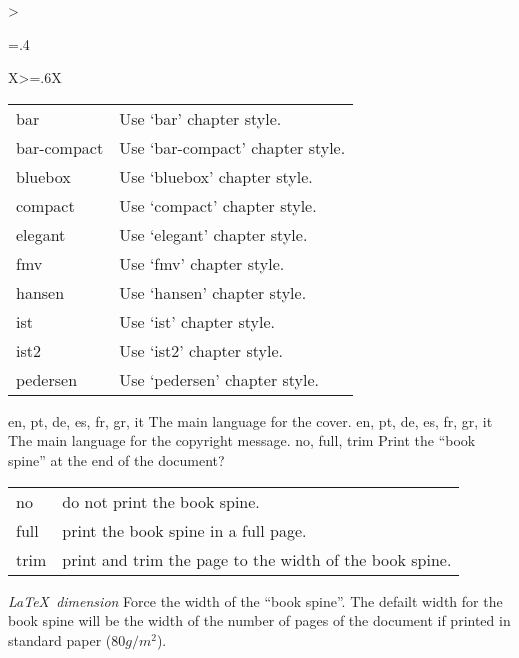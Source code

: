 \begin{xltabular}{\linewidth}{>{\hsize=.4\hsize\raggedright\arraybackslash}X>{\hsize=.6\hsize}X}
{	    \begin{tabular}{@{}l@{ $\rightarrow$ }X@{}}
		bar 		& Use `bar' chapter style. \\
		bar-compact	& Use `bar-compact' chapter style.\\
		bluebox 	& Use `bluebox' chapter style.\\
		compact 	& Use `compact' chapter style.\\
		elegant 	& Use `elegant' chapter style.\\
		fmv 		& Use `fmv' chapter style.\\
		hansen 		& Use `hansen' chapter style.\\
		ist 		& Use `ist' chapter style.\\
		ist2 		& Use `ist2' chapter style.\\
		pedersen 	& Use `pedersen' chapter style.\\
	    \end{tabular}
	    }
    \midrule
    {en, pt, de, es, fr, gr, it}%
    {The main language for the cover.}%
	{%
    }
    \midrule
    {en, pt, de, es, fr, gr, it}%
    {The main language for the copyright message.}%
	{%
    }
    \midrule
    {no, full, trim}%
    {Print the “book spine” at the end of the document?}%
	{%
	    \begin{tabular}{@{}l@{ $\rightarrow$ }X@{}}
		no 		& do not print the book spine.\\
		full	& print the book spine in a full page.\\
		trim 	& print and trim the page to the width of the book spine.\\
	    \end{tabular}
    }
    \midrule
    {\emph{\LaTeX\ dimension}}%
    {Force the width of the “book spine”.}%
	{%
		 The defailt width for the book spine will be the width of the number of pages of the document if printed in standard paper ($80g/m^2$).
    }

\end{xltabular}
